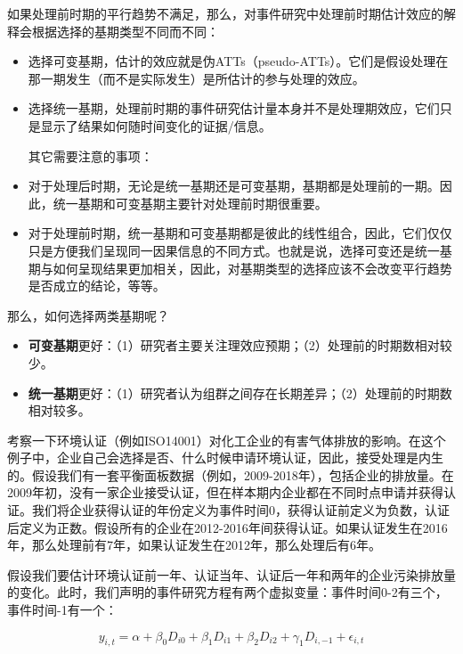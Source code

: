 \documentclass[cn,12pt,math=newtx,citestyle=gb7714-2015,bibstyle=gb7714-2015]{elegantbook}
\begin{document}
	如果处理前时期的平行趋势不满足，那么，对事件研究中处理前时期估计效应的解释会根据选择的基期类型不同而不同：
	
	\begin{itemize}
		\item 选择可变基期，估计的效应就是伪ATTs（pseudo-ATTs）。它们是假设处理在那一期发生（而不是实际发生）是所估计的参与处理的效应。
		\item 选择统一基期，处理前时期的事件研究估计量本身并不是处理期效应，它们只是显示了结果如何随时间变化的证据/信息。
		
		其它需要注意的事项：
		
		\item 对于处理后时期，无论是统一基期还是可变基期，基期都是处理前的一期。因此，统一基期和可变基期主要针对处理前时期很重要。
		\item 对于处理前时期，统一基期和可变基期都是彼此的线性组合，因此，它们仅仅只是方便我们呈现同一因果信息的不同方式。也就是说，选择可变还是统一基期与如何呈现结果更加相关，因此，对基期类型的选择应该不会改变平行趋势是否成立的结论，等等。		
	\end{itemize}	

    那么，如何选择两类基期呢？
    
    \begin{itemize}
         \item  \textbf{可变基期}更好：（1）研究者主要关注理效应预期；（2）处理前的时期数相对较少。
         \item  \textbf{统一基期}更好：（1）研究者认为组群之间存在长期差异；（2）处理前的时期数相对较多。
		\end{itemize}
	
	    考察一下环境认证（例如ISO14001）对化工企业的有害气体排放的影响。在这个例子中，企业自己会选择是否、什么时候申请环境认证，因此，接受处理是内生的。假设我们有一套平衡面板数据（例如，2009-2018年），包括企业的排放量。在2009年初，没有一家企业接受认证，但在样本期内企业都在不同时点申请并获得认证。我们将企业获得认证的年份定义为事件时间0，获得认证前定义为负数，认证后定义为正数。假设所有的企业在2012-2016年间获得认证。如果认证发生在2016年，那么处理前有7年，如果认证发生在2012年，那么处理后有6年。
	    
	    假设我们要估计环境认证前一年、认证当年、认证后一年和两年的企业污染排放量的变化。此时，我们声明的事件研究方程有两个虚拟变量：事件时间0-2有三个，事件时间-1有一个：
	    
	    \begin{equation}
	    y_{i,t} = \alpha + \beta_0 D_{i0} + \beta_1 D_{i1} + \beta_2 D_{i2} + \gamma_1 D_{i,-1}+\epsilon_{i,t}
	    \end{equation}
	
\end{document}
